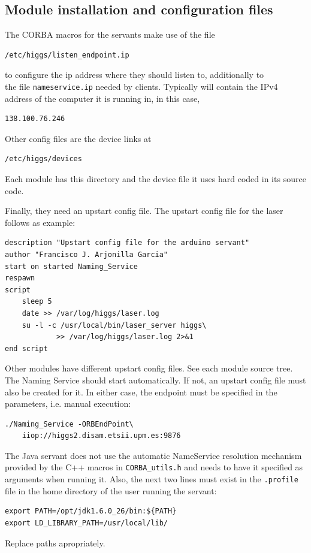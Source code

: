 \subsection{Module installation and configuration files}
\label{ssec:module_config}
The CORBA macros for the servants make use of the file
\begin{verbatim}
/etc/higgs/listen_endpoint.ip
\end{verbatim}
to configure the ip address where they should listen to, additionally to \\
the file \texttt{nameservice.ip} needed by clients.
Typically will contain the IPv4 address of the computer it is running in, in this case,
\begin{verbatim}
138.100.76.246
\end{verbatim}

Other config files are the device links at
\begin{verbatim}
/etc/higgs/devices
\end{verbatim}
Each module has this directory and the device file it uses hard coded in its source code.

Finally, they need an upstart config file. The upstart config file for the laser follows as example:
\begin{verbatim}
description "Upstart config file for the arduino servant"
author "Francisco J. Arjonilla Garcia"
start on started Naming_Service
respawn
script
	sleep 5
	date >> /var/log/higgs/laser.log
	su -l -c /usr/local/bin/laser_server higgs\
            >> /var/log/higgs/laser.log 2>&1
end script
\end{verbatim}
Other modules have different upstart config files. See each module source tree.
The Naming Service should start automatically. If not, an upstart config file must also be created for it. In either case, the endpoint must be specified in the parameters, i.e. manual execution:
\begin{verbatim}
./Naming_Service -ORBEndPoint\
    iiop://higgs2.disam.etsii.upm.es:9876
\end{verbatim}

The Java servant does not use the automatic NameService resolution mechanism provided by the C++ macros in \texttt{CORBA\_utils.h} and needs to have it specified as arguments when running it. Also, the next two lines must exist in the \texttt{.profile} file in the home directory of the user running the servant:
\begin{verbatim}
export PATH=/opt/jdk1.6.0_26/bin:${PATH}
export LD_LIBRARY_PATH=/usr/local/lib/
\end{verbatim}
Replace paths apropriately.

